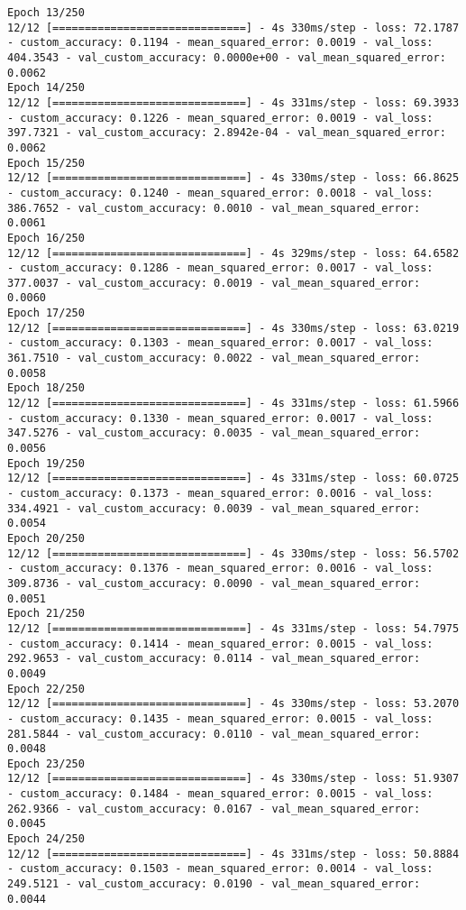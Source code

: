 \begin{lstlisting}
Epoch 13/250
12/12 [==============================] - 4s 330ms/step - loss: 72.1787 - custom_accuracy: 0.1194 - mean_squared_error: 0.0019 - val_loss: 404.3543 - val_custom_accuracy: 0.0000e+00 - val_mean_squared_error: 0.0062
Epoch 14/250
12/12 [==============================] - 4s 331ms/step - loss: 69.3933 - custom_accuracy: 0.1226 - mean_squared_error: 0.0019 - val_loss: 397.7321 - val_custom_accuracy: 2.8942e-04 - val_mean_squared_error: 0.0062
Epoch 15/250
12/12 [==============================] - 4s 330ms/step - loss: 66.8625 - custom_accuracy: 0.1240 - mean_squared_error: 0.0018 - val_loss: 386.7652 - val_custom_accuracy: 0.0010 - val_mean_squared_error: 0.0061
Epoch 16/250
12/12 [==============================] - 4s 329ms/step - loss: 64.6582 - custom_accuracy: 0.1286 - mean_squared_error: 0.0017 - val_loss: 377.0037 - val_custom_accuracy: 0.0019 - val_mean_squared_error: 0.0060
Epoch 17/250
12/12 [==============================] - 4s 330ms/step - loss: 63.0219 - custom_accuracy: 0.1303 - mean_squared_error: 0.0017 - val_loss: 361.7510 - val_custom_accuracy: 0.0022 - val_mean_squared_error: 0.0058
Epoch 18/250
12/12 [==============================] - 4s 331ms/step - loss: 61.5966 - custom_accuracy: 0.1330 - mean_squared_error: 0.0017 - val_loss: 347.5276 - val_custom_accuracy: 0.0035 - val_mean_squared_error: 0.0056
Epoch 19/250
12/12 [==============================] - 4s 331ms/step - loss: 60.0725 - custom_accuracy: 0.1373 - mean_squared_error: 0.0016 - val_loss: 334.4921 - val_custom_accuracy: 0.0039 - val_mean_squared_error: 0.0054
Epoch 20/250
12/12 [==============================] - 4s 330ms/step - loss: 56.5702 - custom_accuracy: 0.1376 - mean_squared_error: 0.0016 - val_loss: 309.8736 - val_custom_accuracy: 0.0090 - val_mean_squared_error: 0.0051
Epoch 21/250
12/12 [==============================] - 4s 331ms/step - loss: 54.7975 - custom_accuracy: 0.1414 - mean_squared_error: 0.0015 - val_loss: 292.9653 - val_custom_accuracy: 0.0114 - val_mean_squared_error: 0.0049
Epoch 22/250
12/12 [==============================] - 4s 330ms/step - loss: 53.2070 - custom_accuracy: 0.1435 - mean_squared_error: 0.0015 - val_loss: 281.5844 - val_custom_accuracy: 0.0110 - val_mean_squared_error: 0.0048
Epoch 23/250
12/12 [==============================] - 4s 330ms/step - loss: 51.9307 - custom_accuracy: 0.1484 - mean_squared_error: 0.0015 - val_loss: 262.9366 - val_custom_accuracy: 0.0167 - val_mean_squared_error: 0.0045
Epoch 24/250
12/12 [==============================] - 4s 331ms/step - loss: 50.8884 - custom_accuracy: 0.1503 - mean_squared_error: 0.0014 - val_loss: 249.5121 - val_custom_accuracy: 0.0190 - val_mean_squared_error: 0.0044

\end{lstlisting}
